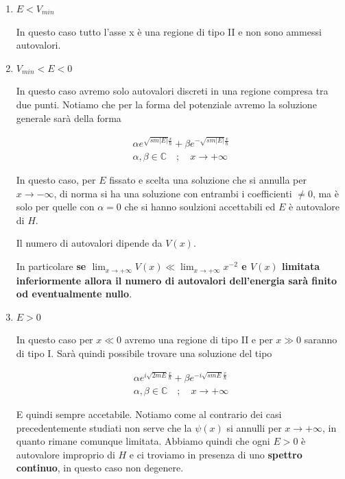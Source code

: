 \begin{enumerate}
	\item $E<V_{min}$ 
	
	In questo caso tutto l'asse x  è una regione di tipo II e non sono ammessi autovalori.
	
	\item $V_{min}<E<0$ 
	
	In questo caso avremo solo autovalori discreti in una regione compresa tra due punti. Notiamo che per la forma del potenziale avremo la soluzione generale sarà della forma
	
	\begin{align}
	\alpha e^{\sqrt{sm|E|} \frac{x}{\hbar}} + \beta e^{-\sqrt{sm|E|} \frac{x}{\hbar}} \\
	\alpha, \beta \in \mathbb{C} \quad; \quad x\rightarrow +\infty
	\end{align}
	
	In questo caso, per $E$ fissato e scelta una soluzione che si annulla per $x\rightarrow -\infty$, di norma si ha una soluzione con entrambi i coefficienti $\neq 0$, ma è solo per quelle con $\alpha =0$ che si hanno soulzioni accettabili ed $E$ è autovalore di $H$.
	
	Il numero di autovalori dipende da $V(x)$. 
	
	In particolare \textbf{se $\lim_{x\rightarrow +\infty}V(x)\ll \lim_{x\rightarrow +\infty}x^{-2}$ e $V(x)$ limitata inferiormente allora  il numero di autovalori dell'energia sarà finito od eventualmente nullo}.
	
	\item $E>0$
	
	In questo caso per $x\ll 0$ avremo una regione di tipo II e per $x \gg 0$ saranno di tipo I. Sarà quindi possibile trovare una soluzione del tipo
	
	\begin{align}
	\alpha e^{i\sqrt{2mE} \frac{x}{\hbar}} + \beta e^{-i\sqrt{smE} \frac{x}{\hbar}} \\
	\alpha, \beta \in \mathbb{C} \quad; \quad x\rightarrow +\infty
	\end{align}
	
	E quindi sempre accetabile. Notiamo come al contrario dei casi precedentemente studiati non serve che la $\psi(x)$ si annulli per $x\rightarrow +\infty $, in quanto rimane comunque limitata. Abbiamo quindi che ogni $E>0$ è autovalore improprio di $H$ e ci troviamo in presenza di uno \textbf{spettro continuo}, in questo caso non degenere.
	\end{enumerate}


